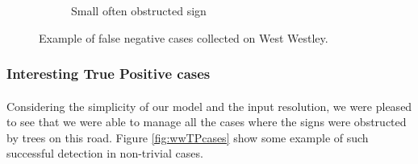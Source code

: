 \begin{figure}
\begin{center}
\begin{subfigure}[t]{.49\linewidth}
     \caption{Small often obstructed sign}
      \label{fig:wwobsFN}
    \end{subfigure}
    \caption{Example of false negative cases collected on West Westley.}
    \label{fig:wwFNcases}
  \end{center}
\end{figure}


\subsubsection{Interesting True Positive cases}
\paragraph{}
Considering the simplicity of our model and the input resolution, we were pleased to see that we were able to manage all the cases where the signs were obstructed by trees on this road. Figure \ref{fig:wwTPcases} show some example of such successful detection in non-trivial cases.


